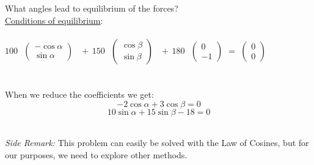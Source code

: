 \documentclass[a4paper,12pt]{report}
\begin{document}
\begin{minipage}[c]{0.6\linewidth}
	\noindent What angles lead to equilibrium of the forces?\\
	
	\noindent \underline{Conditions of equilibrium}:\\ \\
	\small
	$100\,\,$
	\hspace{-4mm}
	$
	\begin{pmatrix}
		-\cos \alpha\\
		\sin \alpha
	\end{pmatrix}
	$
	\hspace{-4mm}
	$\;\,+\,150\,\,$
	\hspace{-4mm}
	$
	\begin{pmatrix}
		\cos \beta\\
		\sin \beta
	\end{pmatrix}
	$
	\hspace{-4mm}
	$\;\,+\, 180\,\,$
	\hspace{-4mm}
	$
	\begin{pmatrix}
		0\\
		-1
	\end{pmatrix}
	$
	$ =$
	$
	\begin{pmatrix}
		0\\
		0
	\end{pmatrix}
	$		
	\\ \\ \\
	\noindent \normalsize
	When we reduce the coefficients we get:\\
	\small
	$$ -2 \cos \alpha + 3 \cos \beta = 0$$
	$$10 \sin \alpha +15 \sin \beta - 18 = 0$$
\end{minipage}
	\\
	\textit{Side Remark:} This problem can easily be solved with the Law of Cosines, but for our purposes, we need to
	 explore other methods.
	\\
	\normalsize
\end{document}
